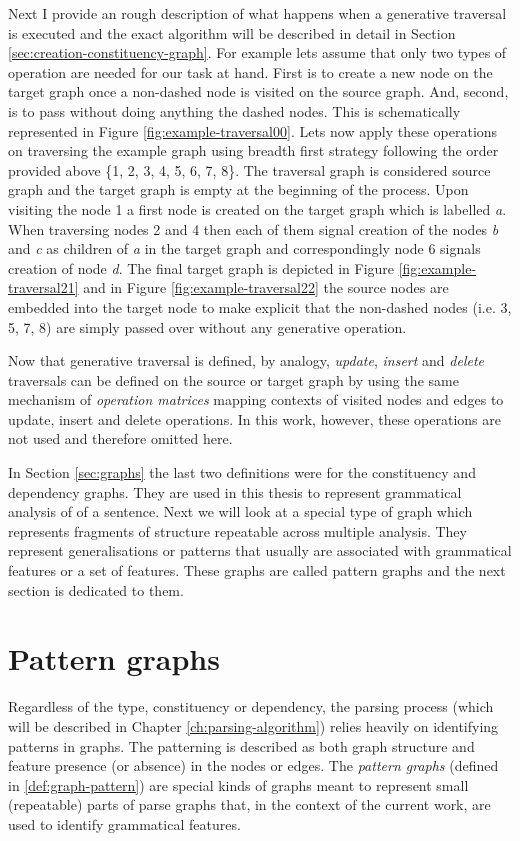Next I provide an rough description of what happens when a generative traversal is executed and the exact algorithm will be described in detail in Section \ref{sec:creation-constituency-graph}. For example lets assume that only two types of operation are needed for our task at hand. First is to create a new node on the target graph once a non-dashed node is visited on the source graph. And, second, is to pass without doing anything the dashed nodes. This is schematically represented in Figure \ref{fig:example-traversal00}. Lets now apply these operations on traversing the example graph using breadth first strategy following the order provided above \{1, 2, 3, 4, 5, 6, 7, 8\}. The traversal graph is considered source graph and the target graph is empty at the beginning of the process. Upon visiting the node 1 a first node is created on the target graph which is labelled \textit{a}. When traversing nodes 2 and 4 then each of them signal creation of the nodes \textit{b} and \textit{c} as children of \textit{a} in the target graph and correspondingly node 6 signals creation of node \textit{d}. The final target graph is depicted in Figure \ref{fig:example-traversal21} and in Figure \ref{fig:example-traversal22} the source nodes are embedded into the target node to make explicit that the non-dashed nodes (i.e. 3, 5, 7, 8) are simply passed over without any generative operation. 

Now that generative traversal is defined, by analogy, \textit{update}, \textit{insert} and \textit{delete} traversals can be defined on the source or target graph by using the same mechanism of \textit{operation matrices} mapping contexts of visited nodes and edges to update, insert and delete operations. In this work, however, these operations are not used and therefore omitted here.

In Section \ref{sec:graphs} the last two definitions were for the constituency and dependency graphs. They are used in this thesis to represent grammatical analysis of of a sentence. Next we will look at a special type of graph which represents fragments of structure repeatable across multiple analysis. They represent generalisations or patterns that usually are associated with grammatical features or a set of features. These graphs are called pattern graphs and the next section is dedicated to them. 

\section{Pattern graphs}
\label{sec:pattern-graphs}
Regardless of the type, constituency or dependency, the parsing process (which will be described in Chapter \ref{ch:parsing-algorithm}) relies heavily on identifying patterns in graphs. The patterning is described as both graph structure and feature presence (or absence) in the nodes or edges. The \textit{pattern graphs} (defined in \ref{def:graph-pattern}) are special kinds of graphs meant to represent small (repeatable) parts of parse graphs that, in the context of the current work, are used to identify grammatical features.

